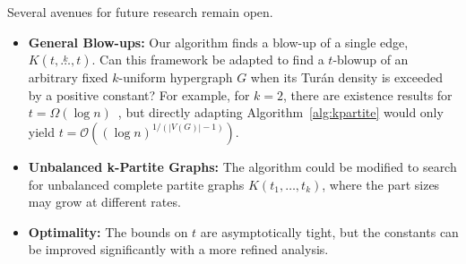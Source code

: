 \documentclass{amsart}
\newcommand{\compoverset}[2]{\ensuremath{K(#2, \overset{#1}{\dots}, #2)}}
\newcommand{\compdots}[2]{\ensuremath{K(#1, \dots, #2)}}
\newcommand{\bigO}[1]{\ensuremath{\mathcal{O}\left(#1\right)}}
\newcommand{\bigOmega}[1]{\ensuremath{\Omega\left(#1\right)}}
\begin{document}
Several avenues for future research remain open.
\begin{itemize}
    \item \textbf{General Blow-ups:} Our algorithm finds a blow-up of a single edge, $\compoverset{k}{t}$.
    Can this framework be adapted to find a $t$-blowup of an arbitrary fixed $k$-uniform hypergraph $G$ when its Tur\'{a}n density is exceeded by a positive constant?
    For example, for $k=2$, there are existence results for $t = \bigOmega{\log n}$~\cite{bollobas1973structure}, but directly adapting Algorithm~\ref{alg:kpartite} would only
    yield $t = \bigO{(\log n)^{1/(|V(G)| - 1)}}$.
    \item \textbf{Unbalanced k-Partite Graphs:} The algorithm could be modified to search for unbalanced complete partite graphs $\compdots{t_1}{t_k}$, where the part sizes may grow at different rates.
    \item \textbf{Optimality:} The bounds on $t$ are asymptotically tight, but the constants can be improved significantly with a more refined analysis.
\end{itemize}



\end{document}
